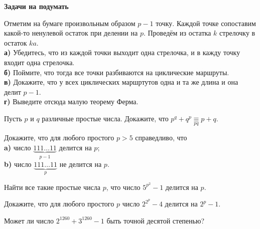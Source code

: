 \newpage
\begin{center}
\textbf{Задачи на подумать}
\end{center}
\begin{problems}
\item Отметим на бумаге произвольным образом $p-1$ точку. Каждой точке сопоставим какой-то ненулевой остаток при делении на $p$. Проведём из остатка $k$ стрелочку в остаток $ka$. \\ \textbf{а)} Убедитесь, что из каждой точки выходит одна стрелочка, и в кажду точку входит одна стрелочка.\\ 
\textbf{б)} Поймите, что тогда все точки разбиваются на циклические маршруты. \\ 
\textbf{в)} Докажите, что у всех циклических маршртутов одна и та же длина и она делит $p-1$.\\ 
\textbf{г)} Выведите отсюда малую теорему Ферма.

\item Пусть $p$ и $q$ различные простые числа. Докажите, что $p^q+q^p \mathop{\equiv}\limits_{pq} p+q$.
\item Докажите, что для любого простого $p>5$ справедливо, что
\\ \textbf{a)} число $\underbrace{111\ldots11}_{p-1}$ делится на $p$;
\\ \textbf{b)} число $\underbrace{111\ldots11}_{p}$ не делится на $p$.
\item Найти все такие простые числа $p$, что число $5^{p^2}-1$ делится на $p$.  
\item Докажите, что для любого простого $p$ число $2^{2^p}-4$ делится на $2^p-1$. 
\item Может ли число $2^{1260} + 3^{1260} - 1$ быть точной десятой степенью?








\end{problems}
